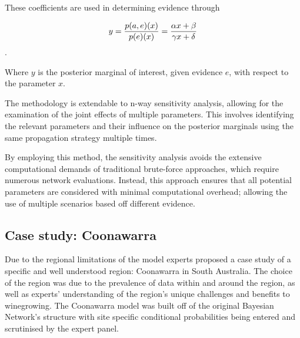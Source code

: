 These coefficients are used in determining evidence through

$$ y = {{p(a, e)(x)}\over{p(e)(x)}}={{\alpha x + \beta}\over{\gamma x + \delta}} $$.

Where $y$ is the posterior marginal of interest, given evidence $e$, with respect to the parameter $x$. 










The methodology is extendable to n-way sensitivity analysis, allowing for the examination of the joint effects of multiple parameters. This involves identifying the relevant parameters and their influence on the posterior marginals using the same propagation strategy multiple times.

By employing this method, the sensitivity analysis avoids the extensive computational demands of traditional brute-force approaches, which require numerous network evaluations. Instead, this approach ensures that all potential parameters are considered with minimal computational overhead; allowing the use of multiple scenarios based off different evidence.

\subsection{Case study: Coonawarra}

Due to the regional limitations of the model experts proposed a case study of a specific and well understood region: Coonawarra in South Australia. The choice of the region was due to the prevalence of data within and around the region, as well as experts' understanding of the region's unique challenges and benefits to winegrowing. The Coonawarra model was built off of the original Bayesian Network's structure with site specific conditional probabilities being entered and scrutinised by the expert panel.

